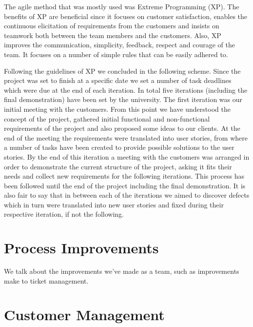 \documentclass{l3proj}
\begin{document}
The agile method that was mostly used was Extreme Programming (XP). The benefits of XP are beneficial since it focuses on
customer satisfaction, enables the continuous elicitation of requirements from the customers and insists on teamwork
both between the team members and the customers. Also, XP improves the communication, simplicity, feedback, respect and
courage of the team. It focuses on a number of simple rules that can be easily adhered to.

Following the guidelines of XP we concluded in the following scheme. Since the project was set to finish at a specific date
we set a number of task deadlines which were due at the end of each iteration. In total five iterations
(including the final demonstration) have been set by the university. The first iteration was our initial meeting with
the customers. From this point we have understood the concept of the project, gathered initial functional and non-functional
requirements of the project and also proposed some ideas to our clients. At the end of the meeting the requirements were
translated into user stories, from where a number of tasks have been created to provide possible solutions to the user stories.
By the end of this iteration a meeting with the customers was arranged in order to demonstrate the current structure of the
project, asking it fits their needs and collect new requirements for the following iterations. This process has been followed
until the end of the project including the final demonstration. It is also fair to say that in between each of the iterations we
aimed to discover defects which in turn were translated into new user stories and fixed during their respective iteration,
if not the following.

\section{Process Improvements}
\label{managing}

We talk about the improvements we've made as a team, such as improvements make to ticket management.



\section{Customer Management}
\label{sec:managing}
\end{document}
